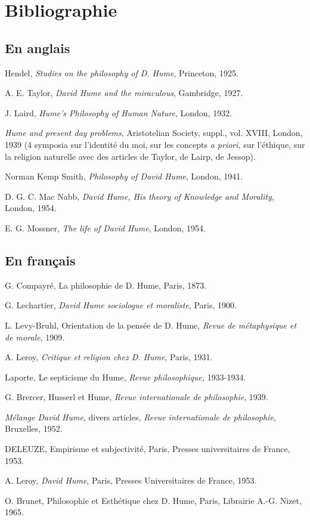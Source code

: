 
\chapter{Bibliographie}

\section{En anglais}

Hendel, {\it Studies on the philosophy of D. Hume}, Princeton,
1925.

A. E. Taylor, {\it David Hume and the miraculous}, Gambridge, 1927.

J. Laird, {\it Hume’s Philosophy of Human Nature}, London,
1932.

{\it Hume and present day problems}, Aristotelian Society,
suppl., vol. XVIII, London, 1939 (4 symposia sur
l'identité du moi, sur les concepts {\it a priori}, sur l’éthique,
sur la religion naturelle avec des articles de Taylor,
de Lairp, de Jessop).

Norman Kemp Smith, {\it Philosophy of David Hume}, London,
1941.

D. G. C. Mac Nabb, {\it David Hume, His theory of Knowledge
and Morality}, London, 1954.

E. G. Mossner, {\it The life of David Hume}, London, 1954.

\section{En français}

G. Compayré, {\it }La philosophie de D. Hume, Paris, 1873.

G. Lechartier, {\it David Hume sociologue et moraliste},
Paris, 1900.

L. Levy-Bruhl, Orientation de la pensée de D. Hume,
{\it Revue de métaphysique et de morale}, 1909.

A. Leroy, {\it Critique et religion chez D. Hume}, Paris, 1931.

Laporte, Le septicisme du Hume, {\it Revue philosophique,}
1933-1934.

G. Brercer, Husserl et Hume, {\it Revue internationale de
philosophie}, 1939.

{\it Mélange David Hume}, divers articles, {\it Revue internationale
de philosophie}, Bruxelles, 1952.

DELEUZE, Empirisme et subjectivité, Paris, Presses universitaires 
de France, 1953.

A. Leroy, {\it David Hume}, Paris, Presses Universitaires de
France, 1953.

O. Brunet, Philosophie et Esthétique chez D. Hume,
Paris, Librairie A.-G. Nizet, 1965.


